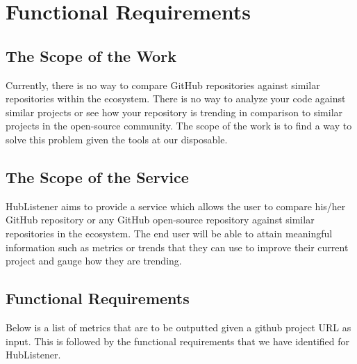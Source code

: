 \documentclass{article}
\begin{document}
\newpage
\section{Functional Requirements}

\subsection{The Scope of the Work}

Currently, there is no way to compare GitHub repositories against similar repositories within the ecosystem. There is no way to analyze your code against similar projects or see how your repository is trending in comparison to similar projects in the open-source community. The scope of the work is to find a way to solve this problem given the tools at our disposable.


\subsection{The Scope of the Service}
HubListener aims to provide a service which allows the user to compare his/her GitHub repository or any GitHub open-source repository against similar repositories in the ecosystem. The end user will be able to attain meaningful information such as metrics or trends that they can use to improve their current project and gauge how they are trending. 

\subsection{Functional Requirements }

Below is a list of metrics that are to be outputted given a github project URL as input. This is followed by the functional requirements that we have identified for HubListener. \newline
\end{document}
